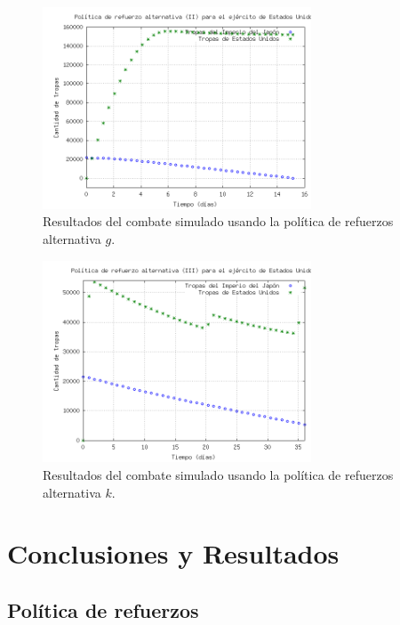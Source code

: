 \documentclass{sig-alternate}
\begin{document}
\begin{figure}[h]
\begin{center}
\includegraphics[width=8cm]{reinforce3.png}
\caption{\label{fig:reinforce3}Resultados del combate simulado usando la política de refuerzos alternativa $g$.}
\end{center}
\end{figure}


\begin{figure}[h]
\begin{center}
\includegraphics[clip, width=8cm]{reinforce4.png}
\caption{\label{fig:reinforce4}Resultados del combate simulado usando la política de refuerzos alternativa $k$.}
\end{center}
\end{figure}


\section{Conclusiones y Resultados}
\subsection{Política de refuerzos}
\end{document}
